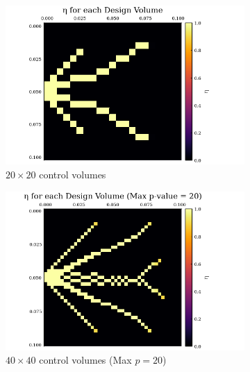 \begin{center}
\begin{figure}
	\begin{subfigure}{0.5\textwidth}
		\centering
		\includegraphics[width=1.1\linewidth]{Chapter_III_Implementation_and_Results/Images/20x20-Final_Design.png}
		\caption{$20\times 20$ control volumes}
		\label{fig:SIMP-Output-20}
	\end{subfigure}
	\begin{subfigure}{0.5\textwidth}
		\centering
		\includegraphics[width=1.1\linewidth]{Chapter_III_Implementation_and_Results/Images/40x40-Final_Design.png}
		\caption{$40\times 40$ control volumes (Max $p=20$)}
		\label{fig:SIMP-Output-40}
	\end{subfigure}\\\vspace{1em}
	\begin{center}
	\begin{subfigure}{0.75\textwidth}

\end{subfigure}
\end{center}
\end{figure}
\end{center}
